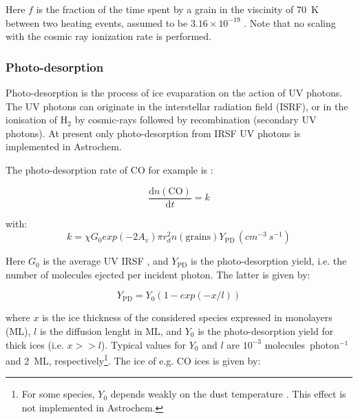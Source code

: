 \documentclass[a4paper,12pt]{article}
\newcommand{\conc}[1]{n(\mathrm{#1})}
\begin{document}
{\noindent
Here $f$ is the fraction of the time spent by a grain in the viscinity
of 70~K between two heating events, assumed to be $3.16 \times
10^{-19}$ \citep{Hasegawa93a}. Note that no scaling with the cosmic
ray ionization rate is performed.

\subsubsection{Photo-desorption}
\label{sec:photo-desorption}

Photo-desorption is the process of ice evaparation on the action of UV
photons. The UV photons can originate in the interstellar radiation
field (ISRF), or in the ionisation of H$_{2}$ by cosmic-rays followed
by recombination (secondary UV photons). At present only
photo-desorption from IRSF UV photons is implemented in Astrochem.

The photo-desorption rate of CO for example is
\citep{Oberg09a,Oberg09b}:

\begin{equation}
  \frac{\mathrm{d} \conc{CO}}{\mathrm{d} t} = k
  \label{eq:photo-desorption-rate}
\end{equation}  

with:
\begin{equation}
  k = \chi G_{0} exp(-2 A_{v}) \pi r_{d}^{2} \conc{grains}
  Y_\mathrm{PD} \, (cm^{-3}~s^{-1})
  \label{eq:photo-desorption}
\end{equation}

\noindent
Here $G_{0}$ is the average UV IRSF \citep[assumed to be
10$^{8}$~photons~cm$^{-2}$~s$^{-1}$;][]{Habing68}, and $Y_\mathrm{PD}$
is the photo-desorption yield, i.e. the number of molecules ejected
per incident photon. The latter is given by:

\begin{equation}
  Y_\mathrm{PD} = Y_{0} (1 - exp(-x / l))
  \label{eq:photo-desorption-yield}
\end{equation}

\noindent
where $x$ is the ice thickness of the considered species expressed in
monolayers (ML), $l$ is the diffusion lenght in ML, and $Y_{0}$ is the
photo-desorption yield for thick ices (i.e. $x >> l$). Typical values
for $Y_{0}$ and $l$ are $10^{-3}$ molecules~photon$^{-1}$ and 2~ML,
  respectively\footnote{For some species, $Y_{0}$ depends weakly on
    the dust temperature \citep{Oberg09b}. This effect is not
    implemented in Astrochem.}. The ice of e.g. CO ices is given by:

}
\end{document}
